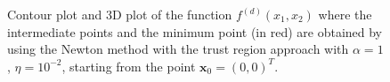 \documentclass[a4paper,11pt]{article}
\begin{document}
		\begin{figure}[H]
		\centering
		 \quad
		\caption{Contour plot and 3D plot of the function $f^{(d)}(x_{1},x_{2})$ where the intermediate points and the minimum point (in red) are obtained by using the Newton method with the trust region approach with $\alpha=1$, $\eta=10^{-2}$, starting from the point $\textbf{x}_{0}=(0,0)^{T}$.}
		\label{Fig:func_d_x0_2_trustreg}
	\end{figure}
	
\end{document}
